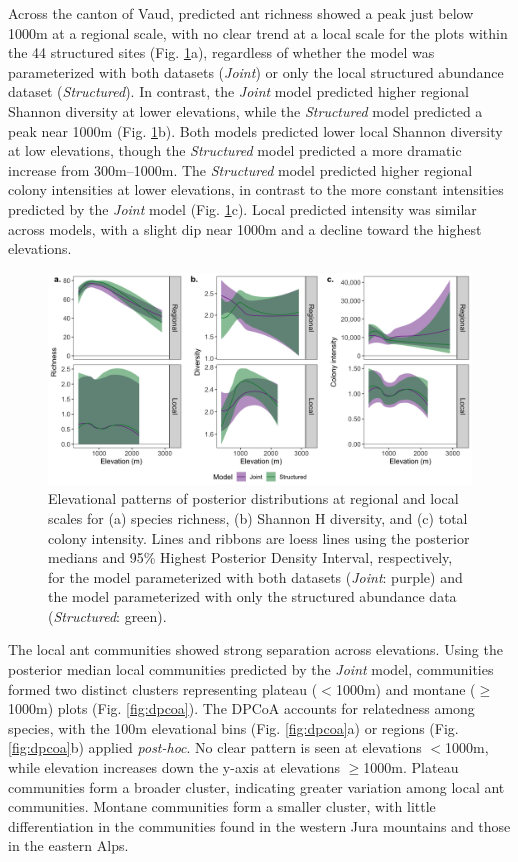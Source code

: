 \documentclass[preprint,review,times,12pt]{elsarticle}
\begin{document}
Across the canton of Vaud, predicted ant richness showed a peak just below 1000m at a regional scale, with no clear trend at a local scale for the plots within the 44 structured sites (Fig. \ref{fig:el_patterns}a), regardless of whether the model was parameterized with both datasets (\emph{Joint}) or only the local structured abundance dataset (\emph{Structured}). In contrast, the \emph{Joint} model predicted higher regional Shannon diversity at lower elevations, while the \emph{Structured} model predicted a peak near 1000m (Fig. \ref{fig:el_patterns}b). Both models predicted lower local Shannon diversity at low elevations, though the \emph{Structured} model predicted a more dramatic increase from 300m–1000m. The \emph{Structured} model predicted higher regional colony intensities at lower elevations, in contrast to the more constant intensities predicted by the \emph{Joint} model (Fig. \ref{fig:el_patterns}c). Local predicted intensity was similar across models, with a slight dip near 1000m and a decline toward the highest elevations. 

\begin{figure}
	\centering\includegraphics[width=6in]{ms/1_Ecography/1/figs/el_patterns.png}
	\caption{\label{fig:el_patterns} Elevational patterns of posterior distributions at regional and local scales for (a) species richness, (b) Shannon H diversity, and (c) total colony intensity. Lines and ribbons are loess lines using the posterior medians and 95\% Highest Posterior Density Interval, respectively, for the model parameterized with both datasets (\emph{Joint}: purple) and the model parameterized with only the structured abundance data (\emph{Structured}: green). }
\end{figure}

The local ant communities showed strong separation across elevations. Using the posterior median local communities predicted by the \emph{Joint} model, communities formed two distinct clusters representing plateau ($<$1000m) and montane ($\geq$1000m) plots (Fig. \ref{fig:dpcoa}). The DPCoA accounts for relatedness among species, with the 100m elevational bins (Fig. \ref{fig:dpcoa}a) or regions (Fig. \ref{fig:dpcoa}b) applied \emph{post-hoc}. No clear pattern is seen at elevations $<$1000m, while elevation increases down the y-axis at elevations $\geq$1000m. Plateau communities form a broader cluster, indicating greater variation among local ant communities. Montane communities form a smaller cluster, with little differentiation in the communities found in the western Jura mountains and those in the eastern Alps.
\end{document}

